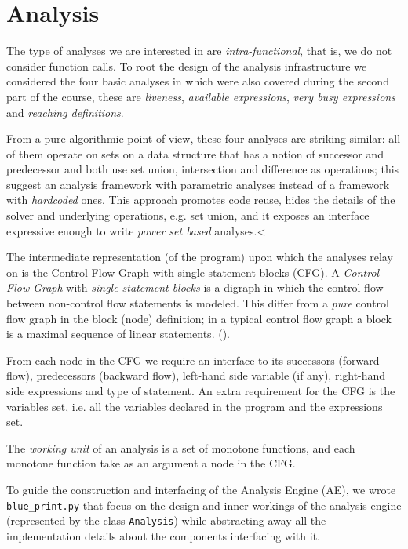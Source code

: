 \section{Analysis}

The type of analyses we are interested in are \emph{intra-functional}, that is, we do not consider function calls. To root the design of the analysis infrastructure
we considered the four basic analyses in \cite{spa} which were also covered during the second part of the course, these are \emph{liveness}, \emph{available expressions},
\emph{very busy expressions} and \emph{reaching definitions}. 

From a pure algorithmic point of view, these four analyses are striking similar: all of them operate on sets on a data structure that has a notion of successor and predecessor 
and both use set union, intersection and difference as operations; this suggest an analysis framework with parametric analyses instead of a framework with \emph{hardcoded}
ones. This approach promotes code reuse, hides the details of the solver and underlying operations, e.g. set union, and it exposes an interface expressive enough to
write \emph{power set based} analyses.<


The intermediate representation (of the program) upon which the analyses relay on is the Control Flow Graph with single-statement blocks (CFG). A \emph{Control Flow Graph} with \emph{single-statement blocks} is a digraph in which the control flow between non-control flow statements is modeled. This differ from a \emph{pure} control flow graph in the block (node) definition; in a typical control flow graph a block is a maximal sequence of linear statements. (\cite{cooper}).

From each node in the CFG we require an interface to its successors (forward flow), predecessors (backward flow), left-hand side variable (if any), right-hand side expressions and type of statement.
An extra requirement for the CFG is the variables set, i.e. all the variables declared in the program and the expressions set.

The \emph{working unit} of an analysis is a set of monotone functions, and each monotone function take as an argument a node in the CFG. 

To guide the construction and interfacing of the Analysis Engine (AE), we wrote \lstinline{blue_print.py} that focus on the design and inner workings of the analysis engine (represented by the class \lstinline{Analysis}) while abstracting away all the implementation details about the components interfacing with it. 

